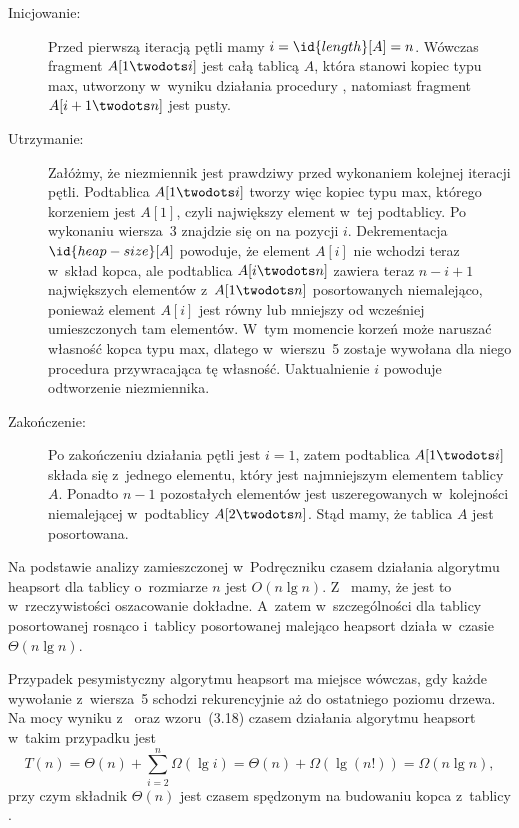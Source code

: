 \exercise %
\begin{description}
	\item[Inicjowanie:] Przed pierwszą iteracją pętli mamy $i=\id{length}[A]=n$. Wówczas fragment $A[1\twodots i]$ jest całą tablicą $A$, która stanowi kopiec typu max, utworzony w~wyniku działania procedury , natomiast fragment $A[i+1\twodots n]$ jest pusty.
	\item[Utrzymanie:] Załóżmy, że niezmiennik jest prawdziwy przed wykonaniem kolejnej iteracji pętli. Podtablica $A[1\twodots i]$ tworzy więc kopiec typu max, którego korzeniem jest $A[1]$, czyli największy element w~tej podtablicy. Po wykonaniu wiersza~3 znajdzie się on na pozycji $i$. Dekrementacja $\id{heap-size}[A]$ powoduje, że element $A[i]$ nie wchodzi teraz w~skład kopca, ale podtablica $A[i\twodots n]$ zawiera teraz $n-i+1$ największych elementów z~$A[1\twodots n]$ posortowanych niemalejąco, ponieważ element $A[i]$ jest równy lub mniejszy od wcześniej umieszczonych tam elementów. W~tym momencie korzeń może naruszać własność kopca typu max, dlatego w~wierszu~5 zostaje wywołana dla niego procedura  przywracająca tę własność. Uaktualnienie $i$ powoduje odtworzenie niezmiennika.
	\item[Zakończenie:] Po zakończeniu działania pętli jest $i=1$, zatem podtablica $A[1\twodots i]$ składa się z~jednego elementu, który jest najmniejszym elementem tablicy $A$. Ponadto $n-1$ pozostałych elementów jest uszeregowanych w~kolejności niemalejącej w~podtablicy $A[2\twodots n]$. Stąd mamy, że tablica $A$ jest posortowana.
\end{description}

\exercise %
Na podstawie analizy zamieszczonej w~Podręczniku czasem działania algorytmu heapsort dla tablicy o~rozmiarze $n$ jest $O(n\lg n)$. Z~ mamy, że jest to w~rzeczywistości oszacowanie dokładne. A~zatem w~szczególności dla tablicy posortowanej rosnąco i~tablicy posortowanej malejąco heapsort działa w~czasie $\Theta(n\lg n)$.

\exercise %
Przypadek pesymistyczny algorytmu heapsort ma miejsce wówczas, gdy każde wywołanie  z~wiersza~5 schodzi rekurencyjnie aż do ostatniego poziomu drzewa. Na mocy wyniku z~ oraz wzoru~(3.18) czasem działania algorytmu heapsort w~takim przypadku jest
\[
	T(n) = \Theta(n)+\sum_{i=2}^{n}\Omega(\lg i) = \Theta(n)+\Omega(\lg(n!)) = \Omega(n\lg n),
\]
przy czym składnik $\Theta(n)$ jest czasem spędzonym na budowaniu kopca z~tablicy .

